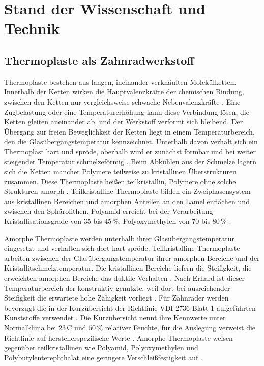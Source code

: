 \chapter{Stand der Wissenschaft und Technik}
\label{chap:stand}

\section{Thermoplaste als Zahnradwerkstoff}
\label{sec:thermoplaste}

Thermoplaste bestehen aus langen, ineinander verknäulten Molekülketten. Innerhalb der Ketten wirken die Hauptvalenzkräfte der chemischen Bindung, zwischen den Ketten nur vergleichsweise schwache Nebenvalenzkräfte \cite[S.~29]{Sto18}. Eine Zugbelastung oder eine Temperaturerhöhung kann diese Verbindung lösen, die Ketten gleiten aneinander ab, und der Werkstoff verformt sich bleibend. Der Übergang zur freien Beweglichkeit der Ketten liegt in einem Temperaturbereich, den die Glasübergangstemperatur kennzeichnet. Unterhalb davon verhält sich ein Thermoplast hart und spröde, oberhalb wird er zunächst formbar und bei weiter steigender Temperatur schmelzeförmig \cite[S.~29]{Sto18}. Beim Abkühlen aus der Schmelze lagern sich die Ketten mancher Polymere teilweise zu kristallinen Überstrukturen zusammen. Diese Thermoplaste heißen teilkristallin, Polymere ohne solche Strukturen amorph \cite[S.~30]{Sto18}. Teilkristalline Thermoplaste bilden ein Zweiphasensystem aus kristallinen Bereichen und amorphen Anteilen an den Lamellenflächen und zwischen den Sphärolithen. Polyamid erreicht bei der Verarbeitung Kristallisationsgrade von $35$ bis $45$\,\%, Polyoxymethylen von $70$ bis $80$\,\% \cite[S.~59 bis 60]{Erh08}.

Amorphe Thermoplaste werden unterhalb ihrer Glasübergangstemperatur eingesetzt und verhalten sich dort hart-spröde. Teilkristalline Thermoplaste arbeiten zwischen der Glasübergangstemperatur ihrer amorphen Bereiche und der Kristallitschmelztemperatur. Die kristallinen Bereiche liefern die Steifigkeit, die erweichten amorphen Bereiche das duktile Verhalten \cite[S.~30 bis 31]{Sto18}. Nach Erhard ist dieser Temperaturbereich der konstruktiv genutzte, weil dort bei ausreichender Steifigkeit die erwartete hohe Zähigkeit vorliegt \cite[S.~70]{Erh08}. Für Zahnräder werden bevorzugt die in der Kurzübersicht der Richtlinie VDI 2736 Blatt 1 aufgeführten Kunststoffe verwendet \cite[S.~5]{VDI2736-1}. Die Kurzübersicht nennt ihre Kennwerte unter Normalklima bei $23$\,\textdegree C und $50$\,\% relativer Feuchte, für die Auslegung verweist die Richtlinie auf herstellerspezifische Werte \cite[S.~5 bis 6]{VDI2736-1}. Amorphe Thermoplaste weisen gegenüber teilkristallinen wie Polyamid, Polyoxymethylen und Polybutylenterephthalat eine geringere Verschleißfestigkeit auf \cite[S.~19]{VDI2736-1}.

